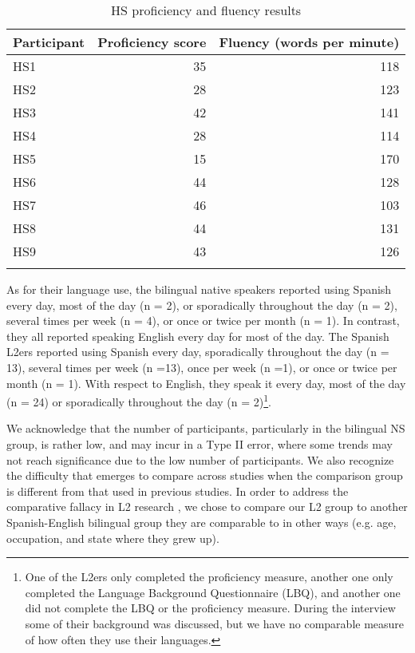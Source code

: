 \documentclass[output=paper,colorlinks,citecolor=brown,draftmode]{langscibook}
\begin{document}
\begin{table}
\caption{HS proficiency and fluency results}
\label{Table 1}
 \begin{tabular}{l rr}
  \lsptoprule
Participant    & Proficiency score  & Fluency (words per minute)\\
  \midrule
  HS1  &   35  &   118\\
  HS2  &   28 &   123\\
  HS3  &   42 &   141\\
  HS4  &   28 &   114\\
  HS5  &   15 &   170\\
  HS6  &   44 &   128\\
  HS7  &   46 &   103\\
  HS8  &   44 &   131\\
  HS9  &   43 &   126\\
  \lspbottomrule
 \end{tabular}
\end{table}

As for their language use, the bilingual native speakers reported using Spanish every day, most of the day (n = 2), or sporadically throughout the day (n = 2), several times per week (n = 4), or once or twice per month (n = 1). In contrast, they all reported speaking English every day for most of the day. The Spanish L2ers reported using Spanish every day, sporadically throughout the day (n = 13), several times per week (n =13), once per week (n =1), or once or twice per month (n = 1). With respect to English, they speak it every day, most of the day (n = 24) or sporadically throughout the day (n = 2)\footnote{One of the L2ers only completed the proficiency measure, another one only completed the Language Background Questionnaire (LBQ), and another one did not complete the LBQ or the proficiency measure. During the interview some of their background was discussed, but we have no comparable measure of how often they use their languages.}.

We acknowledge that the number of participants, particularly in the bilingual NS group, is rather low, and may incur in a Type II error, where some trends may not reach significance due to the low number of participants. We also recognize the difficulty that emerges to compare across studies when the comparison group is different from that used in previous studies. In order to address the comparative fallacy in L2 research \citep{Bley-Vroman1983}, we chose to compare our L2 group to another Spanish-English bilingual group they are comparable to in other ways (e.g. age, occupation, and state where they grew up).
\end{document}
